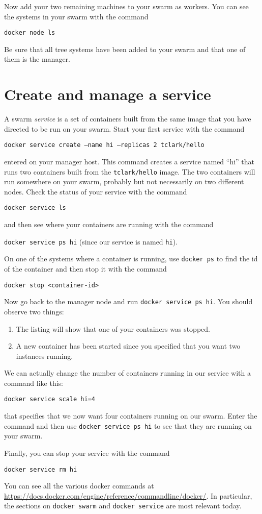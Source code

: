 \documentclass{article}
\begin{document}
Now add your two remaining machines to your swarm as workers. You can see the systems in your swarm with the command

\texttt{docker node ls}

Be sure that all tree systems have been added to your swarm and that one of them is the manager.

\section{Create and manage a service}
A swarm \emph{service} is a set of containers built from the same image that you have directed to be run on your swarm. Start your first service with the command 

\texttt{docker service create --name hi --replicas 2 tclark/hello}

entered on your manager host. This command creates a service named ``hi'' that runs two containers built from the \texttt{tclark/hello} image. The two containers will run somewhere on your swarm, probably but not necessarily on two different nodes. Check the status of your service with the command

\texttt{docker service ls}

and then see where your containers are running with the command

\texttt{docker service ps hi} (since our service is named \texttt{hi}).

On one of the systems where a container is running, use \texttt{docker ps} to find the id of the container and then stop it with the command

\texttt{docker stop <container-id>}

Now go back to the manager node and run \texttt{docker service ps hi}. You should observe two things:

\begin{enumerate}
  \item The listing will show that one of your containers was stopped.
  \item A new container has been started since you specified that you want two instances running.
\end{enumerate}

We can actually change the number of containers running in our service with a command like this:

\texttt{docker service scale hi=4}

that specifies that we now want four containers running on our swarm. Enter the command and then use \texttt{docker service ps hi} to see that they are running on your swarm.

Finally, you can stop your service with the command

\texttt{docker service rm hi}

You can see all the various docker commands at \url{https://docs.docker.com/engine/reference/commandline/docker/}. In particular, the sections on \texttt{docker swarm} and \texttt{docker service} are most relevant today.
\end{document}
